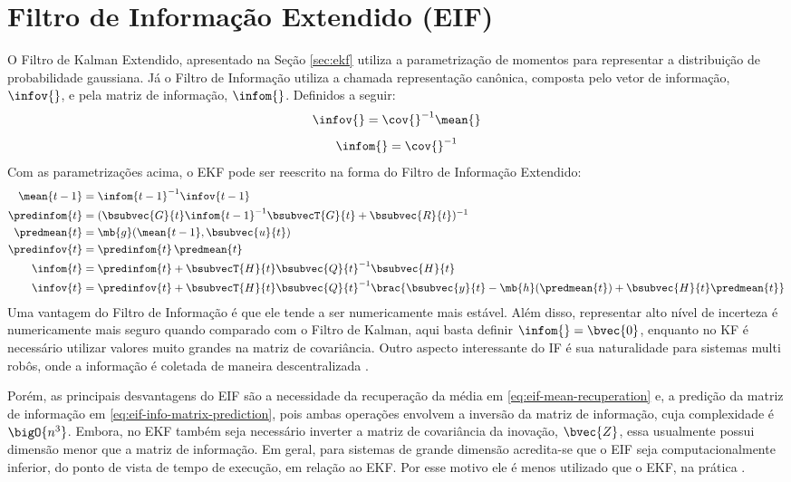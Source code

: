 \section{Filtro de Informação Extendido (EIF)}
O Filtro de Kalman Extendido, apresentado na Seção \ref{sec:ekf} utiliza a
parametrização de momentos para representar a distribuição de probabilidade 
gaussiana. Já o Filtro de Informação utiliza a chamada representação canônica, composta pelo vetor de informação, $\infov{}$, e pela matriz de informação, $\infom{}$. Definidos a seguir:
\begin{equation}
  \infov{} = \cov{}^{-1} \mean{}
  \label{eq:info-vector}
\end{equation}
\begin{equation}
  \infom{} = \cov{}^{-1}
  \label{eq:info-matrix}
\end{equation}
Com as parametrizações acima, o EKF pode ser reescrito na forma do Filtro de 
Informação Extendido:
\begin{align}
  \mean{t-1} &= \infom{t-1}^{-1} \infov{t-1}
  \label{eq:eif-mean-recuperation} \\
  \predinfom{t} &= (\bsubvec{G}{t} \infom{t-1}^{-1} \bsubvecT{G}{t} + \bsubvec{R}{t})^{-1}
  \label{eq:eif-info-matrix-prediction}\\
  \predmean{t} &= \mb{g}(\mean{t-1}, \bsubvec{u}{t})
  \label{eq:eif-mean-prediction} \\
  \predinfov{t} &= \predinfom{t}\,\predmean{t}
  \label{eq:eif-info-vector-prediction} \\
  \infom{t} &= \predinfom{t} + \bsubvecT{H}{t} \bsubvec{Q}{t}^{-1} \bsubvec{H}{t}
  \label{eq:eif-info-matrix-update} \\
  \infov{t} &= \predinfov{t} + \bsubvecT{H}{t}\bsubvec{Q}{t}^{-1} 
  \brac{\bsubvec{y}{t} - \mb{h}(\predmean{t}) + \bsubvec{H}{t}\predmean{t}}
  \label{eq:eif-info-vector-update}
\end{align}
Uma vantagem do Filtro de Informação é que ele tende a ser numericamente mais estável. Além disso, 
representar alto nível de incerteza é numericamente mais seguro quando comparado 
com o Filtro de Kalman, aqui basta definir $\infom{} = \bvec{0}$, enquanto no KF 
é necessário utilizar valores muito grandes na matriz de covariância. Outro 
aspecto interessante do IF é sua naturalidade para sistemas multi robôs, onde a 
informação é coletada de maneira descentralizada \cite[p.~78]{bongard2006probabilistic}.

Porém, as principais desvantagens do EIF são a necessidade da recuperação da média em \ref{eq:eif-mean-recuperation} e, a predição da matriz de informação em 
\ref{eq:eif-info-matrix-prediction}, pois ambas operações envolvem a inversão 
da matriz de informação, cuja complexidade é $\bigO{n^3}$. Embora, no EKF 
também seja 
necessário inverter a matriz de covariância da inovação, $\bvec{Z}$, 
essa usualmente possui dimensão menor que a matriz de informação. 
Em geral, para sistemas de grande dimensão acredita-se que o EIF seja 
computacionalmente inferior, do ponto de vista de tempo de execução, em relação 
ao EKF. Por esse motivo ele é menos utilizado que o EKF, na prática 
\cite[p.~78]{bongard2006probabilistic}.

